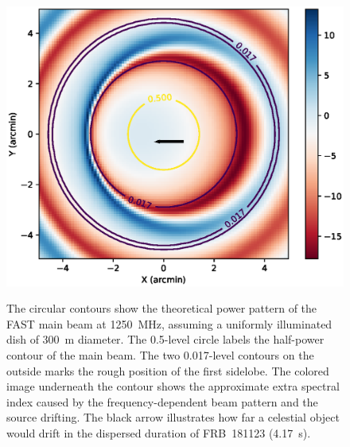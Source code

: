 \begin{figure}%
\centering
\includegraphics[scale=0.5]{beam_diff.eps} \\ 
\caption{\label{fig:beam} 
The circular contours show the theoretical power pattern of the FAST main beam at 1250~MHz, assuming a uniformly illuminated dish of 300~m diameter. The 0.5-level circle labels the half-power contour of the main beam. The two 0.017-level contours on the outside marks the rough position of the first sidelobe. The colored image underneath the contour shows the approximate extra spectral index caused by the frequency-dependent beam pattern and the source drifting. The black arrow illustrates how far a celestial object would drift in the dispersed duration of FRB~181123 (4.17~s). }
\end{figure} 

